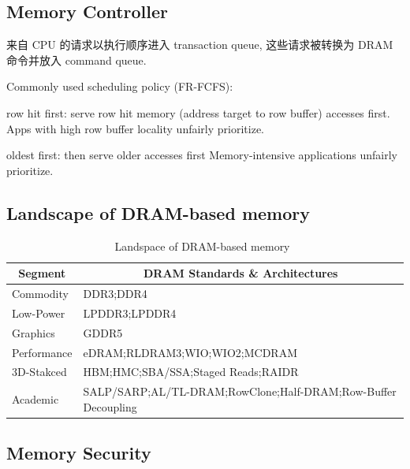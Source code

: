 \documentclass[UTF8,12pt,a4paper]{article}
\begin{document}
\subsection{Memory Controller}
来自 CPU 的请求以执行顺序进入 transaction queue,
这些请求被转换为 DRAM 命令并放入 command queue.

Commonly used scheduling policy (FR-FCFS):
\begin{compactitem}
  \item row hit first: serve row hit memory (address target to row buffer) accesses first.
  Apps with high row buffer locality unfairly prioritize.
  \item oldest first: then serve older accesses first
  Memory-intensive applications unfairly prioritize.
\end{compactitem}


\subsection{Landscape of DRAM-based memory}
\begin{table}
  \begin{small}
    \caption{Landspace of DRAM-based memory~\cite{DBLP:journals/cal/KimYM16}}
    \label{tab:memory_landscape}
    \begin{center}
      \begin{tabular}[c]{l|l}
        \hline
        \multicolumn{1}{c|}{\textbf{Segment}} & 
        \multicolumn{1}{c}{\textbf{DRAM Standards \& Architectures}} \\
        \hline
        Commodity & DDR3;DDR4 \\
        Low-Power & LPDDR3;LPDDR4 \\
        Graphics & GDDR5 \\
        Performance & eDRAM;RLDRAM3;WIO;WIO2;MCDRAM \\
        3D-Stakced & HBM;HMC;SBA/SSA;Staged Reads;RAIDR \\
        Academic & SALP/SARP;AL/TL-DRAM;RowClone;Half-DRAM;Row-Buffer Decoupling \\
        \hline
      \end{tabular}
    \end{center}
  \end{small}
\end{table}

\subsection{Memory Security}
\end{document}

